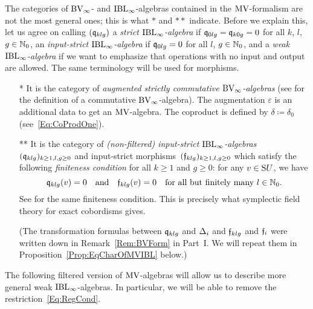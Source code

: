 \documentclass[\MainFolder/Text.tex]{subfiles}
\begin{document}
The categories of $\mathrm{BV}_\infty$- and $\mathrm{IBL}_\infty$-algebras contained in the $\mathrm{MV}$-formalism are not the most general ones; this is what $*$ and $**$ indicate. Before we explain this, let us agree on calling $(\mathfrak{q}_{klg})$ a \emph{strict $\mathrm{IBL}_\infty$-algebra} if $\mathfrak{q}_{0lg}=\mathfrak{q}_{k0g}=0$ for all $k$, $l$, $g\in \mathbb{N}_0$, an \emph{input-strict $\mathrm{IBL}_\infty$-algebra} if $\mathfrak{q}_{0lg} = 0$ for all $l$, $g\in \mathbb{N}_0$, and a \emph{weak $\mathrm{IBL}_\infty$-algebra} if we want to emphasize that operations with no input and output are allowed. The same terminology will be used for morphisms.
\begin{itemize}
\item[*] It is the category of \emph{augmented strictly commutative $\mathrm{BV}_\infty$-algebras} (see \cite[Section~5]{Cieliebak2007} for the definition of a commutative $\mathrm{BV}_\infty$-algebra). The augmentation $\varepsilon$ is an additional data to get an $\mathrm{MV}$-algebra. The coproduct is defined by $\delta\coloneqq \delta_{0}$ (see~\eqref{Eq:CoProdOne}).
\item[**] It is the category of \emph{(non-filtered) input-strict $\mathrm{IBL}_\infty$-algebras} $(\mathfrak{q}_{klg})_{k \ge 1, l, g\ge 0}$ and input-strict morphisms~$(\mathfrak{f}_{klg})_{k\ge 1,l, g\ge 0}$ which satisfy the following \emph{finiteness condition} for all $k\ge 1$ and $g\ge 0$: for any $v\in \mathrm{S} U$, we have
\begin{equation}\label{Eq:RegCond}
\mathfrak{q}_{klg}(v) = 0\quad\text{and}\quad\mathfrak{f}_{klg}(v) = 0 \quad\text{for all but finitely many }l\in \mathbb{N}_0.
\end{equation}
See \cite[Remark~(6), p.\,14]{Cieliebak2015} for the same finiteness condition. This is precisely what symplectic field theory for exact cobordisms gives.

(The transformation formulas between $\mathfrak{q}_{klg}$ and $\operatorname{\Delta}_i$ and $\mathfrak{f}_{klg}$ and $\mathfrak{f}_i$ were written down in Remark~\ref{Rem:BVForm} in Part~I. We will repeat them in Proposition~\ref{Prop:EqCharOfMVIBL} below.)
\end{itemize}


The following filtered version of $\mathrm{MV}$-algebras will allow us to describe more general weak $\mathrm{IBL}_\infty$-algebras. In particular, we will be able to remove the restriction~\eqref{Eq:RegCond}.
\end{document}
